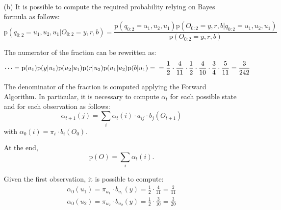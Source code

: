 {\begin{itemize}
\begin{itemize}
			\item[-] Observation probabilities are give in the matrix $B$. 
			In particular, the probability of observing $m$ is given by 
			$b_i(m)=\mathrm{P}(O_t=v_m|q_t=s_i)$, with $1 \leq i \leq N$ and 
			$1 \leq j \leq M$
			
			\begin{equation*}
			B = 
			\left[\begin{matrix}
			\dfrac{5}{11} & \dfrac{2}{11} & \dfrac{4}{11}\\[15pt]
			\dfrac{3}{10} & \dfrac{4}{10} & \dfrac{3}{10} 
			\end{matrix}\right]
			\mbox{.}
			\end{equation*}
			
				
		\end{itemize}
		\item[(b)] It is possible to compute the required probability relying 
		on Bayes formula as follows:
		\begin{equation*}
			\mathrm{p}(q_{0:2}=u_1,u_2, u_1 | O_{0:2}=y,r,b) = 
			\frac{\mathrm{p}(q_{0:2}=u_1,u_2, u_1)\mathrm{p}(O_{0:2}=y,r,b | 
			q_{0:2}=u_1,u_2, u_1)}{\mathrm{p}(O_{0:2}=y,r,b)}
		\end{equation*}
		
		The numerator of the fraction can be rewritten as:
		\begin{equation*}
			\dots = \mathrm{p}(u_1) \mathrm{p}(y|u_1) 
			\mathrm{p}(u_2|u_1) \mathrm{p}(r|u_2) \mathrm{p}(u_1|u_2) 
			\mathrm{p}(b|u_1) = \\
			= \frac{1}{2} \cdot \frac{4}{11} \cdot \frac{1}{2} \cdot 
			\frac{4}{10} \cdot \frac{3}{4} \cdot \frac{5}{11} = \frac{3}{242}
		\end{equation*}
		
		The denominator of the fraction is computed applying the Forward 
		Algorithm. In particular, it is necessary to compute $\alpha_t$ for 
		each possible state and for each observation as follows:
		\begin{equation*}
			\alpha_{t+1}(j) = \sum_i \alpha_t(i) \cdot a_{ij} \cdot b_j(O_{t+1})
		\end{equation*}
		with $\alpha_0(i) = \pi_i \cdot b_i(O_0)$.
		
		At the end, 		
		\begin{equation*}
		\mathrm{p}(O) = \sum_i \alpha_t(i) \mbox{.}
		\end{equation*}
		
		Given the first observation, it is possible to compute:
		\begin{align*}
			\alpha_0(u_1) = \pi_{u_1} \cdot b_{u_1}(y) = \frac{1}{2} \cdot 
			\frac{4}{11} = \frac{2}{11}\\
			\alpha_0(u_2) = \pi_{u_2} \cdot b_{u_2}(y) = \frac{1}{2} \cdot 
			\frac{3}{10} = \frac{3}{20}
		\end{align*}
		

\end{itemize}}
